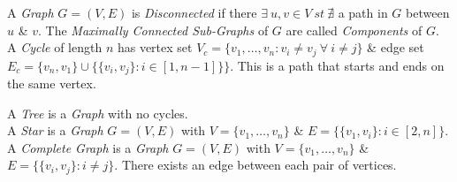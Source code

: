 \documentclass[11pt,a4paper]{article}
\begin{document}
A \textit{Graph} $G=(V,E)$ is \textit{Disconnected} if there $\exists\ u,v\in V\ st\ \nexists$ a path in $G$ between $u$ \& $v$. The \textit{Maximally Connected Sub-Graphs} of $G$ are called \textit{Components} of $G$.\\

A \textit{Cycle} of length $n$ has vertex set $V_c=\{v_1,\dots,v_n:v_i\neq v_j\ \forall\ i\neq j\}$ \& edge set $E_c=\{v_n,v_1\}\cup\big\{\{v_i,v_j\}:i\in[1,n-1]\}\big\}$. This is a path that starts and ends on the same vertex.\\


A \textit{Tree} is a \textit{Graph} with no cycles.\\

A \textit{Star} is a \textit{Graph} $G=(V,E)$ with $V=\{v_1,\dots,v_n\}$ \& $E=\{\{v_1,v_i\}:i\in[2,n]\}$.\\

A \textit{Complete Graph} is a \textit{Graph} $G=(V,E)$ with $V=\{v_1,\dots,v_n\}$ \& $E=\{\{v_i,v_j\}:i\neq j\}$. There exists an edge between each pair of vertices.\\
\end{document}
